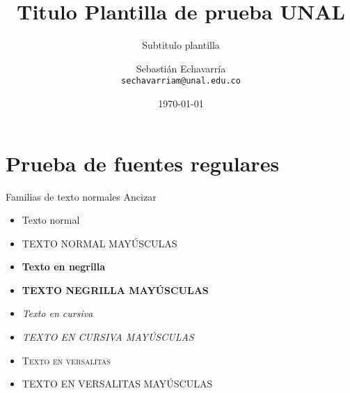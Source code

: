 \documentclass[]{beamer} %
\title{Titulo Plantilla de prueba UNAL}
\subtitle{Subtitulo plantilla}
\date[ISPN ’80]{\today}
\author[Sebasti\'an Echavarr\'ia ]{Sebasti\'an Echavarr\'ia\\ \texttt{sechavarriam@unal.edu.co}}
\institute[]{Facultad de Minas - Departamento de Ingeniería Civil - Sede Medellín}
\begin{document}
	
	\begin{frame}\end{frame} %
	
	
	\begin{frame} %
		\titlepage
	\end{frame}

\begin{frame} 
	\tableofcontents[pausesections]
\end{frame}


\section{Prueba de fuentes regulares}

\begin{frame}{Familias de texto normales Ancizar}
	\begin{itemize}
	\item  Texto normal\\
	\item  TEXTO NORMAL MAYÚSCULAS\\
	\item  \textbf{Texto en negrilla}\\
	\item  \textbf{TEXTO NEGRILLA MAYÚSCULAS}\\
	\item  \textit{Texto en cursiva}\\
	\item  \textit{TEXTO EN CURSIVA MAYÚSCULAS}\\
	\item  \textsc{Texto en versalitas}\\
	\item  \textsc{TEXTO EN VERSALITAS MAYÚSCULAS}
	\end{itemize}
	
\end{frame}
\end{document}
